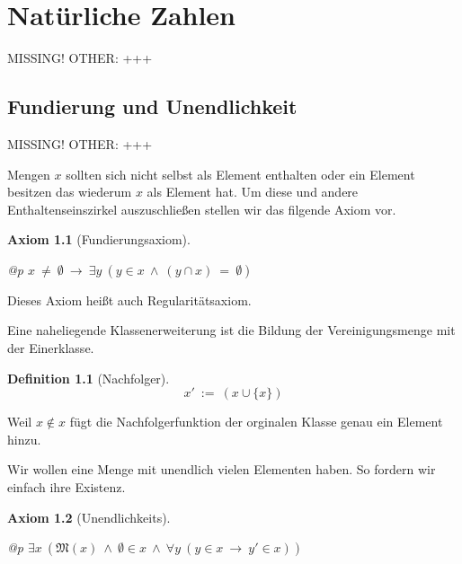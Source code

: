 \documentclass[a4paper,german,10pt,twoside]{book}
\newtheorem{ax}{Axiom}
\theoremstyle{definition}
\newtheorem{defn}[thm]{Definition}
\theoremstyle{remark}
\begin{document}

\chapter{Nat{\"u}rliche Zahlen} \label{chapter5} \hypertarget{chapter5}{}

MISSING! OTHER: +++

\section{Fundierung und Unendlichkeit} \label{chapter5_section0} \hypertarget{chapter5_section0}{}
MISSING! OTHER: +++

\par
Mengen $x$ sollten sich nicht selbst als Element enthalten oder ein Element besitzen das wiederum
$x$ als Element hat. Um diese und andere Enthaltenseinszirkel auszuschlie{\ss}en stellen wir das filgende
Axiom vor.

\begin{ax}[Fundierungsaxiom]
\label{axiom:foundation} \hypertarget{axiom:foundation}{}
\mbox{}
\begin{longtable}{{@{\extracolsep{\fill}}p{\linewidth}}}
\centering $x \ \neq  \ \emptyset\ \rightarrow \ \exists y\ (y \in x\ \land \ (y \cap x) \ =  \ \emptyset)$
\end{longtable}

\end{ax}

Dieses Axiom hei{\ss}t auch Regularit{\"a}tsaxiom.


\par
Eine naheliegende Klassenerweiterung ist die Bildung der
Vereinigungsmenge mit der Einerklasse.

\begin{defn}[Nachfolger]
\label{definition:successor} \hypertarget{definition:successor}{}
$$x'\ := \ (x \cup \{ x \})$$

\end{defn}

Weil $x \notin x$ f{\"u}gt die Nachfolgerfunktion der orginalen Klasse
genau ein Element hinzu.


\par
Wir wollen eine Menge mit unendlich vielen Elementen haben. So fordern wir einfach ihre Existenz.

\begin{ax}[Unendlichkeits]
\label{axiom:infinity} \hypertarget{axiom:infinity}{}
\mbox{}
\begin{longtable}{{@{\extracolsep{\fill}}p{\linewidth}}}
\centering $\exists x\ (\mathfrak{M}(x)\ \land \ \emptyset \in x\ \land \ \forall y\ (y \in x\ \rightarrow \ y' \in x))$
\end{longtable}

\end{ax}
\end{document}
